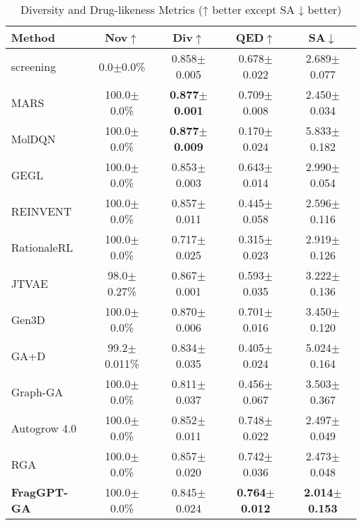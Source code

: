\documentclass[letterpaper,journal]{IEEEtran}
\begin{document}
\begin{table}[!t]
    \caption{Diversity and Drug-likeness Metrics (↑ better except SA ↓ better)}
    \label{tab:diversity_metrics}
    \centering    
    \small
    \setlength{\tabcolsep}{4pt}
    
    \begin{tabular}{l c c c c}
        \hline\hline
        Method & Nov$\uparrow$ & Div$\uparrow$ & QED$\uparrow$ & SA$\downarrow$ \\
        \hline
        screening & 0.0$\pm$0.0\% & 0.858$\pm$0.005 & 0.678$\pm$0.022 & 2.689$\pm$0.077 \\
        MARS & 100.0$\pm$0.0\% & \textbf{0.877}$\pm$\textbf{0.001} & 0.709$\pm$0.008 & 2.450$\pm$0.034 \\
            MolDQN & 100.0$\pm$0.0\% & \textbf{0.877}$\pm$\textbf{0.009} & 0.170$\pm$0.024 & 5.833$\pm$0.182 \\
        GEGL & 100.0$\pm$0.0\% & 0.853$\pm$0.003 & 0.643$\pm$0.014 & 2.990$\pm$0.054 \\
        REINVENT & 100.0$\pm$0.0\% & 0.857$\pm$0.011 & 0.445$\pm$0.058 & 2.596$\pm$0.116 \\
        RationaleRL & 100.0$\pm$0.0\% & 0.717$\pm$0.025 & 0.315$\pm$0.023 & 2.919$\pm$0.126 \\
        JTVAE & 98.0$\pm$0.27\% & 0.867$\pm$0.001 & 0.593$\pm$0.035 & 3.222$\pm$0.136 \\
        Gen3D & 100.0$\pm$0.0\% & 0.870$\pm$0.006 & 0.701$\pm$0.016 & 3.450$\pm$0.120 \\
        GA+D & 99.2$\pm$0.011\% & 0.834$\pm$0.035 & 0.405$\pm$0.024 & 5.024$\pm$0.164 \\
        Graph-GA & 100.0$\pm$0.0\% & 0.811$\pm$0.037 & 0.456$\pm$0.067 & 3.503$\pm$0.367 \\
        Autogrow 4.0 & 100.0$\pm$0.0\% & 0.852$\pm$0.011 & 0.748$\pm$0.022 & 2.497$\pm$0.049 \\
        RGA  & 100.0$\pm$0.0\% & 0.857$\pm$0.020 & 0.742$\pm$0.036 & 2.473$\pm$0.048 \\                 
        \hline
        \textbf{FragGPT-GA} & 100.0$\pm$0.0\% & 0.845$\pm$0.024 & \textbf{0.764$\pm$0.012} & \textbf{2.014$\pm$0.153} \\            
        \hline\hline
    \end{tabular}
\end{table}


\end{document}
